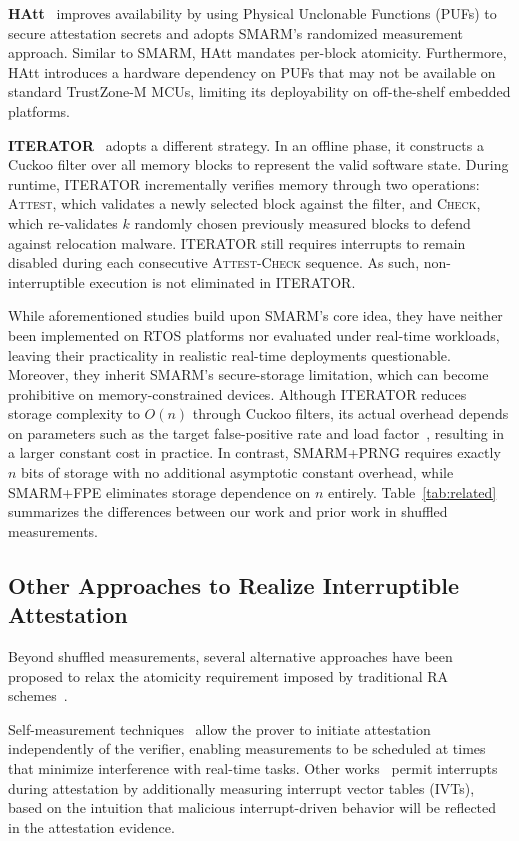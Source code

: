 \documentclass{ieeeaccess}
\newcommand{\rtsmarmone}{SMARM+PRNG\xspace}
\newcommand{\rtsmarmtwo}{SMARM+FPE\xspace}
\begin{document}
\textbf{HAtt}~\cite{hatt} improves availability by
using Physical Unclonable Functions (PUFs) to secure
attestation secrets and adopts SMARM's randomized
measurement approach. 
Similar to SMARM, HAtt mandates per-block atomicity.
Furthermore, HAtt introduces a hardware dependency on PUFs that may not be available on standard TrustZone-M MCUs, limiting its deployability on off-the-shelf embedded platforms.


\textbf{ITERATOR}~\cite{iterator} adopts a different strategy.
In an offline phase, it constructs a Cuckoo filter over all memory blocks to represent the valid software state.
During runtime, ITERATOR incrementally verifies memory through two operations: \textsc{Attest}, which validates a newly selected block against the filter, and \textsc{Check}, which re-validates $k$ randomly chosen previously measured blocks to defend against relocation malware.
ITERATOR still requires interrupts to remain disabled during each consecutive \textsc{Attest}-\textsc{Check} sequence.
As such, non-interruptible execution is not eliminated in ITERATOR.

While aforementioned studies build upon SMARM's core idea, they have neither been implemented on RTOS platforms nor evaluated under real-time workloads, leaving their practicality in realistic real-time deployments questionable.
Moreover, they inherit SMARM's secure-storage limitation, which can become prohibitive on memory-constrained devices.
Although ITERATOR reduces storage complexity to $O(n)$ through Cuckoo filters, its actual overhead depends on parameters such as the target false-positive rate and load factor~\cite{fan2014cuckoo}, resulting in a larger constant cost in practice.
In contrast, \rtsmarmone requires exactly $n$ bits of storage with no additional asymptotic constant overhead, while \rtsmarmtwo eliminates storage dependence on $n$ entirely.
Table~\ref{tab:related} summarizes the differences between our work and prior work in shuffled measurements.

\subsection{Other Approaches to Realize Interruptible Attestation}
\label{sec:related-ra}

Beyond shuffled measurements, several alternative approaches have been proposed to relax the atomicity requirement imposed by traditional RA schemes~\cite{ra_survey,hydra,smart,nunes2024toward,sancus2}.

Self-measurement techniques~\cite{erasmus,carpent2018reconciling,iterator} allow the prover to initiate attestation independently of the verifier, enabling measurements to be scheduled at times that minimize interference with real-time tasks.
Other works~\cite{iscflat,asap,pistis} permit interrupts during attestation by additionally measuring interrupt vector tables (IVTs), based on the intuition that malicious interrupt-driven behavior will be reflected in the attestation evidence.
\end{document}
